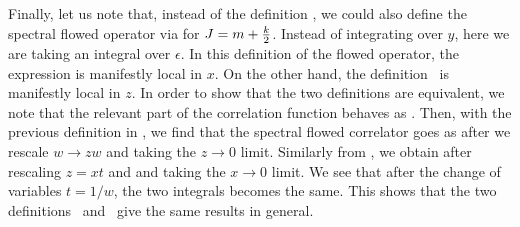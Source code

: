 Finally, let us note that, instead of the definition  ,
we could also define the spectral flowed operator via
\eqn{}
for $J = m + {k\over 2}$. Instead of integrating over $y$,
here we are taking an integral over $\epsilon$.
In this definition of the flowed operator, the expression is
manifestly local in $x$. On the other hand, the definition
\ is manifestly local in $z$.
In order to show that the two definitions are equivalent, we
note that the relevant part of the correlation function behaves
as \yintegral .
Then, with the previous definition in  ,
we  find that the spectral flowed correlator goes as
\eqn{}
after we rescale $w \to z w $ and taking the $z \to 0 $ limit.
Similarly from  , we obtain
\eqn{}
after rescaling $z = xt$ and and taking the $x \to 0 $ limit.
We see that after the change of variables $ t = 1/w$, the two integrals
becomes the same. This shows that the two definitions
\ and \ give the same results in general.


